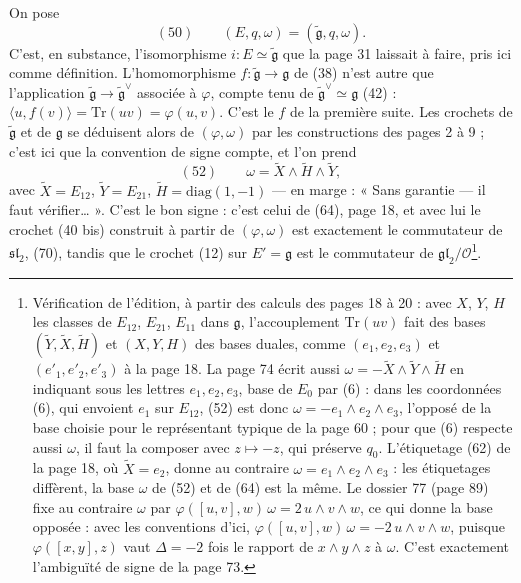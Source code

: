 \documentclass[11pt,a4paper]{article}
\begin{document}
On pose
\[
  (50) \qquad (E, q, \omega) = (\widetilde{\mathfrak{g}}, q, \omega) .
\]
C'est, en substance, l'isomorphisme $i : E \simeq \widetilde{\mathfrak{g}}$ que la page 31
laissait à faire, pris ici comme définition. L'homomorphisme
$f : \widetilde{\mathfrak{g}} \to \mathfrak{g}$ de (38) n'est autre que l'application
$\widetilde{\mathfrak{g}} \to \widetilde{\mathfrak{g}}^{\vee}$ associée à $\varphi$, compte tenu
de $\widetilde{\mathfrak{g}}^{\vee} \simeq \mathfrak{g}$ (42) : $\langle u, f(v) \rangle =
\mathrm{Tr}(uv) = \varphi(u, v)$. C'est le $f$ de la première suite. Les crochets de
$\widetilde{\mathfrak{g}}$ et de $\mathfrak{g}$ se déduisent alors de $(\varphi, \omega)$ par
les constructions des pages 2 à 9 ; c'est ici que la convention de signe compte,
et l'on prend
\[
  (52) \qquad \omega = \widetilde{X} \wedge \widetilde{H} \wedge \widetilde{Y} ,
\]
avec $\widetilde{X} = E_{12}$, $\widetilde{Y} = E_{21}$,
$\widetilde{H} = \mathrm{diag}(1, -1)$ — en marge : « Sans garantie — il faut
vérifier… ». C'est le bon signe : c'est celui de (64), page 18, et avec lui le
crochet (40 bis) construit à partir de $(\varphi, \omega)$ est exactement le
commutateur de $\mathfrak{sl}_2$, (70), tandis que le crochet (12) sur
$E' = \mathfrak{g}$ est le commutateur de $\mathfrak{gl}_2/\mathcal{O}$\footnote{Vérification
de l'édition, à partir des calculs des pages 18 à 20 : avec $X$, $Y$, $H$ les
classes de $E_{12}$, $E_{21}$, $E_{11}$ dans $\mathfrak{g}$, l'accouplement
$\mathrm{Tr}(uv)$ fait des bases $(\widetilde{Y}, \widetilde{X}, \widetilde{H})$ et
$(X, Y, H)$ des bases duales, comme $(e_1, e_2, e_3)$ et $(e'_1, e'_2, e'_3)$
à la page 18. La page 74 écrit aussi $\omega = -\widetilde{X} \wedge \widetilde{Y} \wedge
\widetilde{H}$ en indiquant sous les lettres $e_1, e_2, e_3$, base de $E_0$ par (6) :
dans les coordonnées (6), qui envoient $e_1$ sur $E_{12}$, (52) est donc
$\omega = -e_1 \wedge e_2 \wedge e_3$, l'opposé de la base choisie pour le représentant
typique de la page 60 ; pour que (6) respecte aussi $\omega$, il faut la composer
avec $z \mapsto -z$, qui préserve $q_0$. L'étiquetage (62) de la page 18, où
$\widetilde{X} = e_2$, donne au contraire $\omega = e_1 \wedge e_2 \wedge e_3$ : les
étiquetages diffèrent, la base $\omega$ de (52) et de (64) est la même. Le dossier 77 (page 89) fixe au contraire $\omega$ par
$\varphi([u, v], w)\,\omega = 2\,u \wedge v \wedge w$, ce qui donne la base opposée : avec
les conventions d'ici, $\varphi([u, v], w)\,\omega = -2\,u \wedge v \wedge w$, puisque
$\varphi([x, y], z)$ vaut $\Delta = -2$ fois le rapport de $x \wedge y \wedge z$ à
$\omega$. C'est exactement l'ambiguïté de signe de la page 73.}.
\end{document}
